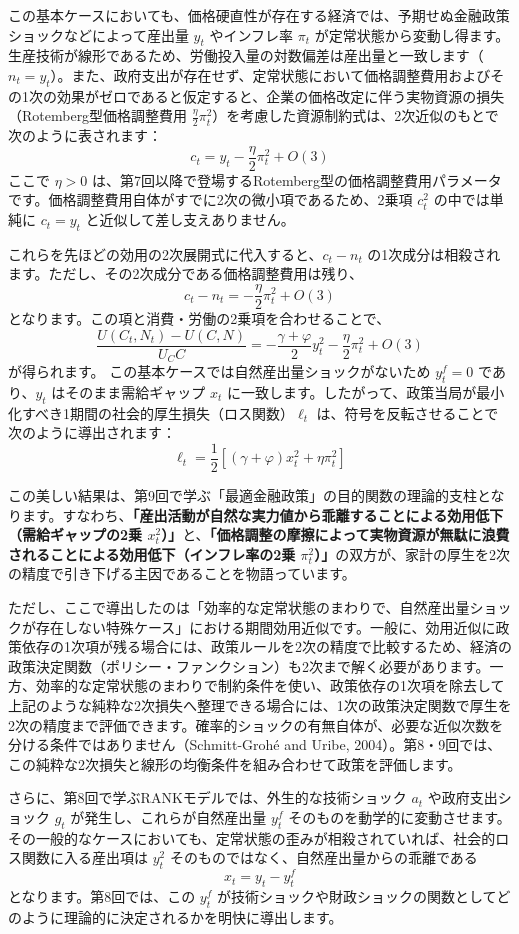 \documentclass[
  japanese,
  lualatex,
  ja=standard,
  12pt,
  a4paper]{ltjsarticle}
\begin{document}
この基本ケースにおいても、価格硬直性が存在する経済では、予期せぬ金融政策ショックなどによって産出量
\(y_t\) やインフレ率 \(\pi_t\)
が定常状態から変動し得ます。生産技術が線形であるため、労働投入量の対数偏差は産出量と一致します（\(n_t=y_t\)）。また、政府支出が存在せず、定常状態において価格調整費用およびその1次の効果がゼロであると仮定すると、企業の価格改定に伴う実物資源の損失（Rotemberg型価格調整費用
\(\frac{\eta}{2}\pi_t^2\)）を考慮した資源制約式は、2次近似のもとで次のように表されます：
\[
c_t
=
y_t-\frac{\eta}{2}\pi_t^2+O(3)
\] ここで \(\eta>0\)
は、第7回以降で登場するRotemberg型の価格調整費用パラメータです。価格調整費用自体がすでに2次の微小項であるため、2乗項
\(c_t^2\) の中では単純に \(c_t=y_t\) と近似して差し支えありません。

これらを先ほどの効用の2次展開式に代入すると、\(c_t-n_t\)
の1次成分は相殺されます。ただし、その2次成分である価格調整費用は残り、
\[
c_t-n_t=-\frac{\eta}{2}\pi_t^2+O(3)
\] となります。この項と消費・労働の2乗項を合わせることで、 \[
\frac{U(C_t,N_t)-U(C,N)}{U_C C}
=
-\frac{\gamma+\varphi}{2}y_t^2
-\frac{\eta}{2}\pi_t^2
+O(3)
\] が得られます。 この基本ケースでは自然産出量ショックがないため
\(y_t^f=0\) であり、\(y_t\) はそのまま需給ギャップ \(x_t\)
に一致します。したがって、政策当局が最小化すべき1期間の社会的厚生損失（ロス関数）\(\ell_t\)
は、符号を反転させることで次のように導出されます： \[
\ell_t
=
\frac{1}{2}
\left[
(\gamma+\varphi)x_t^2+\eta\pi_t^2
\right]
\]

この美しい結果は、第9回で学ぶ「最適金融政策」の目的関数の理論的支柱となります。すなわち、\textbf{「産出活動が自然な実力値から乖離することによる効用低下（需給ギャップの2乗
\(x_t^2\)）」}と、\textbf{「価格調整の摩擦によって実物資源が無駄に浪費されることによる効用低下（インフレ率の2乗
\(\pi_t^2\)）」}の双方が、家計の厚生を2次の精度で引き下げる主因であることを物語っています。

ただし、ここで導出したのは「効率的な定常状態のまわりで、自然産出量ショックが存在しない特殊ケース」における期間効用近似です。一般に、効用近似に政策依存の1次項が残る場合には、政策ルールを2次の精度で比較するため、経済の政策決定関数（ポリシー・ファンクション）も2次まで解く必要があります。一方、効率的な定常状態のまわりで制約条件を使い、政策依存の1次項を除去して上記のような純粋な2次損失へ整理できる場合には、1次の政策決定関数で厚生を2次の精度まで評価できます。確率的ショックの有無自体が、必要な近似次数を分ける条件ではありません（Schmitt-Grohé
and Uribe,
2004）。第8・9回では、この純粋な2次損失と線形の均衡条件を組み合わせて政策を評価します。

さらに、第8回で学ぶRANKモデルでは、外生的な技術ショック \(a_t\)
や政府支出ショック \(g_t\) が発生し、これらが自然産出量 \(y_t^f\)
そのものを動学的に変動させます。その一般的なケースにおいても、定常状態の歪みが相殺されていれば、社会的ロス関数に入る産出項は
\(y_t^2\) そのものではなく、自然産出量からの乖離である \[
x_t=y_t-y_t^f
\] となります。第8回では、この \(y_t^f\)
が技術ショックや財政ショックの関数としてどのように理論的に決定されるかを明快に導出します。
\end{document}
